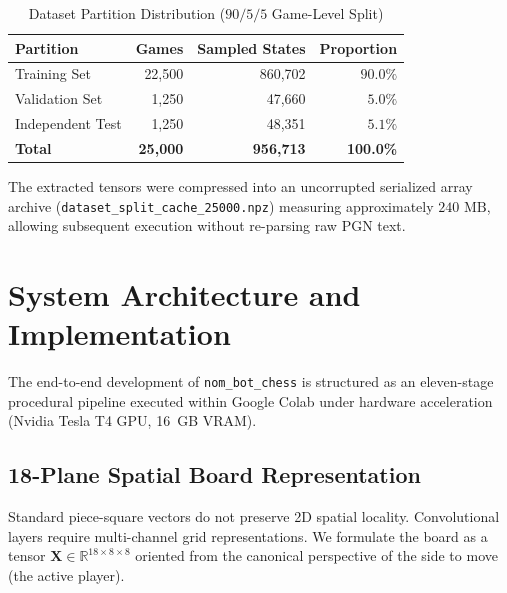 \documentclass[10pt,journal,compsoc]{IEEEtran}
\begin{document}
\begin{table}[htbp]
\centering
\caption{Dataset Partition Distribution ($90/5/5$ Game-Level Split)}
\label{tab:split_summary}
\begin{tabular}{lrrr}
\toprule
\textbf{Partition} & \textbf{Games} & \textbf{Sampled States} & \textbf{Proportion} \\
\midrule
Training Set       & 22,500         & 860,702                 & $90.0\%$ \\
Validation Set     & 1,250          & 47,660                  & $5.0\%$ \\
Independent Test   & 1,250          & 48,351                  & $5.1\%$ \\
\midrule
\textbf{Total}     & \textbf{25,000}& \textbf{956,713}        & \textbf{100.0\%} \\
\bottomrule
\end{tabular}
\end{table}

The extracted tensors were compressed into an uncorrupted serialized array archive (\texttt{dataset\_split\_cache\_25000.npz}) measuring approximately $240\text{ MB}$, allowing subsequent execution without re-parsing raw PGN text.

\section{System Architecture and Implementation}
\label{sec:architecture}

The end-to-end development of \texttt{nom\_bot\_chess} is structured as an eleven-stage procedural pipeline executed within Google Colab under hardware acceleration (Nvidia Tesla T4 GPU, 16~GB VRAM).

\subsection{18-Plane Spatial Board Representation}
Standard piece-square vectors do not preserve 2D spatial locality. Convolutional layers require multi-channel grid representations. We formulate the board as a tensor $\mathbf{X} \in \mathbb{R}^{18 \times 8 \times 8}$ oriented from the canonical perspective of the side to move (the active player).
\end{document}
